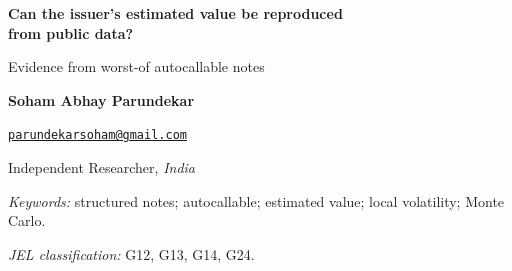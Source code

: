 \documentclass[11pt,letterpaper]{article}
\providecommand{\SohamLocation}{\textit{India}}
\begin{document}
\thispagestyle{plain}
\begin{center}
{\LARGE\bfseries Can the issuer's estimated value be reproduced\\from public data?\par}
\vspace{7pt}
{\large Evidence from worst-of autocallable notes\par}
\vspace{14pt}

{\fontsize{10.1}{11.7}\selectfont\bfseries Soham Abhay Parundekar\par}
\vspace{1.5pt}
{\fontsize{8.0}{9.4}\selectfont\href{mailto:parundekarsoham@gmail.com}%
  {\nolinkurl{parundekarsoham@gmail.com}}\par}
\vspace{1.0pt}
{\fontsize{8.5}{10.0}\selectfont Independent Researcher, \SohamLocation\par}
\end{center}
\vspace{8pt}

\begin{abstract}

\end{abstract}

\noindent\textit{Keywords:} structured notes; autocallable; estimated value;
local volatility; Monte Carlo.\par
\noindent\textit{JEL classification:} G12, G13, G14, G24.
\vspace{8pt}














\begingroup
\small
\setlength{\bibsep}{4pt}


\endgroup

\appendix



\end{document}
